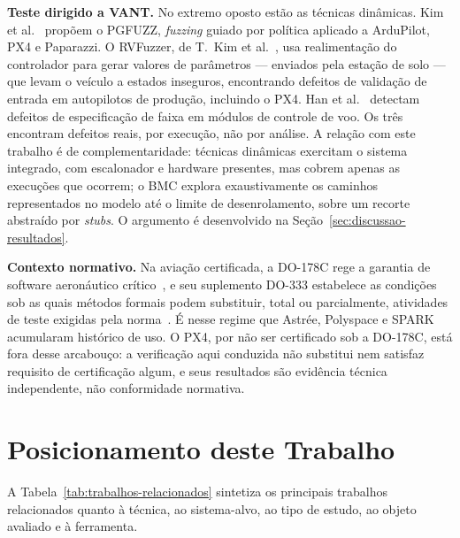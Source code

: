 \textbf{Teste dirigido a VANT.} No extremo oposto estão as técnicas dinâmicas.
Kim et al.~\cite{Kim2021PGFuzz} propõem o PGFUZZ, \textit{fuzzing} guiado por
política aplicado a ArduPilot, PX4 e Paparazzi. O RVFuzzer, de T.~Kim et
al.~\cite{Kim2019RVFuzzer}, usa realimentação do controlador para gerar valores
de parâmetros --- enviados pela estação de solo --- que levam o veículo a estados
inseguros, encontrando defeitos de validação de entrada em autopilotos de
produção, incluindo o PX4. Han et al.~\cite{Han2024RangeFuzz} detectam defeitos de
especificação de faixa em módulos de controle de voo. Os três encontram defeitos
reais, por execução, não por análise. A relação com este trabalho é de
complementaridade: técnicas dinâmicas exercitam o sistema integrado, com
escalonador e hardware presentes, mas cobrem apenas as execuções que ocorrem; o
BMC explora exaustivamente os caminhos representados no modelo até o limite de
desenrolamento, sobre um recorte abstraído por \textit{stubs}. O argumento é desenvolvido na
Seção~\ref{sec:discussao-resultados}.

\textbf{Contexto normativo.} Na aviação certificada, a DO-178C rege a garantia de
software aeronáutico crítico~\cite{RTCA_DO178C}, e seu suplemento DO-333
estabelece as condições sob as quais métodos formais podem substituir, total ou
parcialmente, atividades de teste exigidas pela norma~\cite{RTCA_DO333}. É nesse
regime que Astrée, Polyspace e SPARK acumularam histórico de uso. O PX4, por não
ser certificado sob a DO-178C, está fora desse arcabouço: a verificação aqui
conduzida não substitui nem satisfaz requisito de certificação algum, e seus
resultados são evidência técnica independente, não conformidade normativa.

\section{Posicionamento deste Trabalho}
\label{sec:rel-posicionamento}

A Tabela~\ref{tab:trabalhos-relacionados} sintetiza os principais trabalhos
relacionados quanto à técnica, ao sistema-alvo, ao tipo de estudo, ao objeto
avaliado e à ferramenta.

